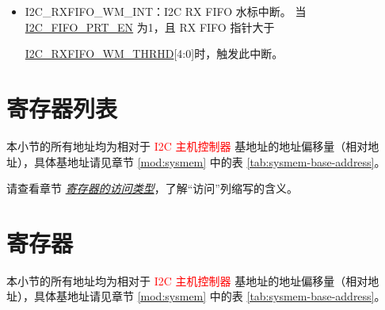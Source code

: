 \documentclass[main\_\_CN.tex]{subfiles}
\begin{document}
\begin{itemize}
\hyperref[fielddesc:I2CTXFIFOWMTHRHD]{I2C\_TXFIFO\_WM\_THRHD}[4:0]时，触发此中断。
\item \label{int:i2c-rxfifo-wm}I2C\_RXFIFO\_WM\_INT：I2C RX FIFO 水标中断。 当\hyperref[fielddesc:I2CFIFOPRTEN]{I2C\_FIFO\_PRT\_EN} 为1，且 RX FIFO 指针大于

\hyperref[fielddesc:I2CRXFIFOWMTHRHD]{I2C\_RXFIFO\_WM\_THRHD}[4:0]时，触发此中断。
\end{itemize}




\clearpage
\hypertarget{i2c-reg-summ}{}
\section{寄存器列表}
\label{sec:i2c-reg-summ}

本小节的所有地址均为相对于 \textcolor{red}{I2C 主机控制器} 基地址的地址偏移量（相对地址），具体基地址请见章节 \ref{mod:sysmem} \textit{} 中的表 \ref{tab:sysmem-base-address}。

请查看章节 \hyperref[glossary-access-types]{\textit{寄存器的访问类型}}，了解“访问”列缩写的含义。






\clearpage
\section{寄存器}

本小节的所有地址均为相对于 \textcolor{red}{I2C 主机控制器} 基地址的地址偏移量（相对地址），具体基地址请见章节 \ref{mod:sysmem} \textit{} 中的表 \ref{tab:sysmem-base-address}。


\end{document}
